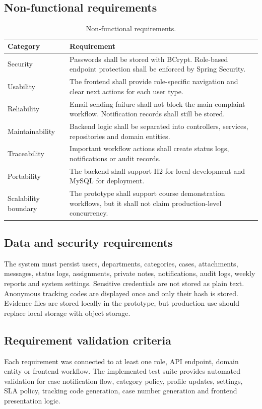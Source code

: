 \documentclass[11pt,a4paper]{article}
\begin{document}
\subsection{Non-functional requirements}
\begin{table}[H]
\centering
\small
\begin{tabularx}{\textwidth}{p{}Y}
\toprule
Category & Requirement\\
\midrule
Security & Passwords shall be stored with BCrypt. Role-based endpoint protection shall be enforced by Spring Security.\\
Usability & The frontend shall provide role-specific navigation and clear next actions for each user type.\\
Reliability & Email sending failure shall not block the main complaint workflow. Notification records shall still be stored.\\
Maintainability & Backend logic shall be separated into controllers, services, repositories and domain entities.\\
Traceability & Important workflow actions shall create status logs, notifications or audit records.\\
Portability & The backend shall support H2 for local development and MySQL for deployment.\\
Scalability boundary & The prototype shall support course demonstration workflows, but it shall not claim production-level concurrency.\\
\bottomrule
\end{tabularx}
\caption{Non-functional requirements.}
\end{table}

\subsection{Data and security requirements}
The system must persist users, departments, categories, cases, attachments, messages, status logs, assignments, private notes, notifications, audit logs, weekly reports and system settings. Sensitive credentials are not stored as plain text. Anonymous tracking codes are displayed once and only their hash is stored. Evidence files are stored locally in the prototype, but production use should replace local storage with object storage.

\subsection{Requirement validation criteria}
Each requirement was connected to at least one role, API endpoint, domain entity or frontend workflow. The implemented test suite provides automated validation for case notification flow, category policy, profile updates, settings, SLA policy, tracking code generation, case number generation and frontend presentation logic.
\end{document}
